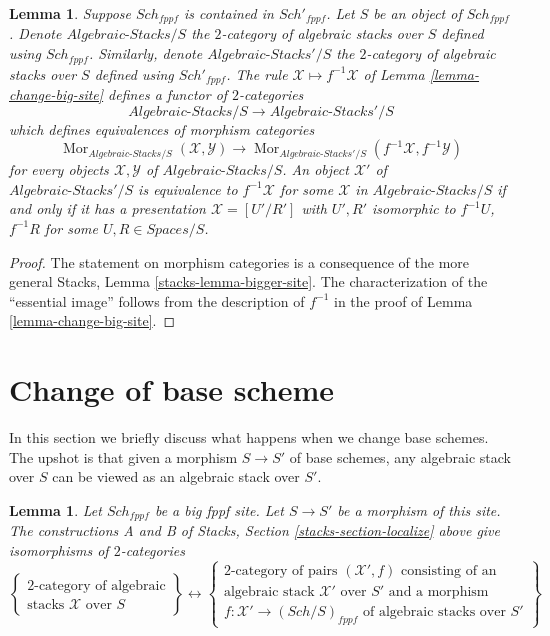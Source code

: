 \documentclass{stacks-project}
\theoremstyle{plain}
\newtheorem{lemma}[subsection]{Lemma}
\theoremstyle{definition}
\theoremstyle{remark}
\numberwithin{equation}{subsection}
\def\Sch{\mathit{Sch}}
\def\Mor{\mathop{\mathrm{Mor}}\nolimits}
\begin{document}
\begin{lemma}
\label{lemma-fully-faithful}
Suppose $\Sch_{fppf}$ is contained in $\Sch'_{fppf}$.
Let $S$ be an object of $\Sch_{fppf}$. Denote
$\textit{Algebraic-Stacks}/S$ the $2$-category of algebraic stacks over $S$
defined using $\Sch_{fppf}$. Similarly, denote
$\textit{Algebraic-Stacks}'/S$ the $2$-category of algebraic stacks over $S$
defined using $\Sch'_{fppf}$. The rule
$\mathcal{X} \mapsto f^{-1}\mathcal{X}$ of
Lemma \ref{lemma-change-big-site}
defines a functor of $2$-categories
$$
\textit{Algebraic-Stacks}/S \longrightarrow \textit{Algebraic-Stacks}'/S
$$
which defines equivalences of morphism categories
$$
\Mor_{\textit{Algebraic-Stacks}/S}(\mathcal{X}, \mathcal{Y})
\longrightarrow
\Mor_{\textit{Algebraic-Stacks}'/S}(f^{-1}\mathcal{X}, f^{-1}\mathcal{Y})
$$
for every objects $\mathcal{X}, \mathcal{Y}$ of
$\textit{Algebraic-Stacks}/S$. An object
$\mathcal{X}'$ of $\textit{Algebraic-Stacks}'/S$
is equivalence to $f^{-1}\mathcal{X}$ for some
$\mathcal{X}$ in $\textit{Algebraic-Stacks}/S$
if and only if it has a presentation $\mathcal{X} = [U'/R']$
with $U', R'$ isomorphic to $f^{-1}U$, $f^{-1}R$ for some
$U, R \in \textit{Spaces}/S$.
\end{lemma}

\begin{proof}
The statement on morphism categories is a consequence of the more general
Stacks, Lemma \ref{stacks-lemma-bigger-site}.
The characterization of the ``essential image'' follows from the description
of $f^{-1}$ in the proof of
Lemma \ref{lemma-change-big-site}.
\end{proof}


\section{Change of base scheme}
\label{section-change-base-scheme}

\noindent
In this section we briefly discuss what happens when we change base schemes.
The upshot is that given a morphism $S \to S'$ of base schemes, any algebraic
stack over $S$ can be viewed as an algebraic stack over $S'$.

\begin{lemma}
\label{lemma-category-of-spaces-over-smaller-base-scheme}
Let $\Sch_{fppf}$ be a big fppf site.
Let $S \to S'$ be a morphism of this site.
The constructions A and B of
Stacks, Section \ref{stacks-section-localize}
above give isomorphisms of $2$-categories
$$
\left\{
\begin{matrix}
2\text{-category of algebraic}\\
\text{stacks }\mathcal{X}\text{ over }S
\end{matrix}
\right\}
\leftrightarrow
\left\{
\begin{matrix}
2\text{-category of pairs }(\mathcal{X}', f)\text{ consisting of an}\\
\text{algebraic stack }\mathcal{X}'\text{ over }S'\text{ and a morphism}\\
f : \mathcal{X}' \to (\Sch/S)_{fppf}\text{ of algebraic stacks over }S'
\end{matrix}
\right\}
$$
\end{lemma}
\end{document}
